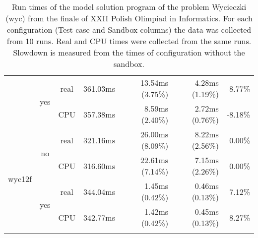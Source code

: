 \documentclass[en]{pracamgr}
\begin{document}
\begin{appendices}
\begin{small}
\begin{longtable}{|l|c|c|r|r|r|r|}
                          \cline{2-7}
                          & \multirow{2}{*}{yes} & real & 361.03ms & 13.54ms (3.75\%) & 4.28ms (1.19\%) & -8.77\% \\*
                          &                      & CPU  & 357.38ms & 8.59ms (2.40\%) & 2.72ms (0.76\%) & -8.18\% \\
\hline
\multirow{4}{*}{wyc12f}   & \multirow{2}{*}{no}  & real & 321.16ms & 26.00ms (8.09\%) & 8.22ms (2.56\%) & 0.00\% \\*
                          &                      & CPU  & 316.60ms & 22.61ms (7.14\%) & 7.15ms (2.26\%) & 0.00\% \\*
                          \cline{2-7}
                          & \multirow{2}{*}{yes} & real & 344.04ms & 1.45ms (0.42\%) & 0.46ms (0.13\%) & 7.12\% \\*
                          &                      & CPU  & 342.77ms & 1.42ms (0.42\%) & 0.45ms (0.13\%) & 8.27\% \\
\hline
\caption{Run times of the model solution program of the problem Wycieczki (wyc) from the finale of XXII Polish Olimpiad in Informatics. For each configuration (Test case and Sandbox columns) the data was collected from 10 runs. Real and CPU times were collected from the same runs. Slowdown is measured from the times of configuration without the sandbox.}
\label{table:wyc_model_solution_runtimes}
\end{longtable}
\end{small}


\end{appendices}
\end{document}
